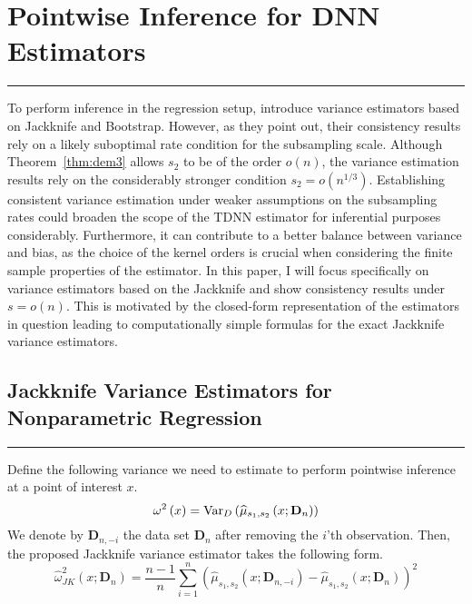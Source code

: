 \section{Pointwise Inference for DNN Estimators}\label{sec:pw_inf}
\hrule
To perform inference in the regression setup, \citet{demirkaya_optimal_2024} introduce variance estimators based on Jackknife and Bootstrap.
However, as they point out, their consistency results rely on a likely suboptimal rate condition for the subsampling scale.
Although Theorem~\ref{thm:dem3} allows $s_2$ to be of the order $o(n)$, the variance estimation results rely on the considerably stronger condition $s_2 = o(n^{1/3})$.
Establishing consistent variance estimation under weaker assumptions on the subsampling rates could broaden the scope of the TDNN estimator for inferential purposes considerably.
Furthermore, it can contribute to a better balance between variance and bias, as the choice of the kernel orders is crucial when considering the finite sample properties of the estimator.
In this paper, I will focus specifically on variance estimators based on the Jackknife and show consistency results under $s = o(n)$.
This is motivated by the closed-form representation of the estimators in question leading to computationally simple formulas for the exact Jackknife variance estimators.

\subsection{Jackknife Variance Estimators for Nonparametric Regression}\label{Var_Ests}
\hrule

Define the following variance we need to estimate to perform pointwise inference at a point of interest $x$.
\begin{equation}\label{eq:TDNN_Var}
	\omega^{2}\left(x\right)
	= \text{Var}_{D}\left(\widehat{\mu}_{s_1, s_2}\left(x; \mathbf{D}_n\right)\right)
\end{equation}
We denote by $\mathbf{D}_{n, -i}$ the data set $\mathbf{D}_n$ after removing the $i$'th observation.
Then, the proposed Jackknife variance estimator takes the following form.
\begin{equation}\label{eq:JK_Var_Est}
	\hat{\omega}_{JK}^2\left(x; \mathbf{D}_n\right)
	= \frac{n-1}{n} \sum_{i = 1}^{n}\left(\hat{\mu}_{s_1, s_2}\left(x; \mathbf{D}_{n, -i}\right) - \hat{\mu}_{s_1, s_2}\left(x; \mathbf{D}_{n}\right)\right)^2
\end{equation}

